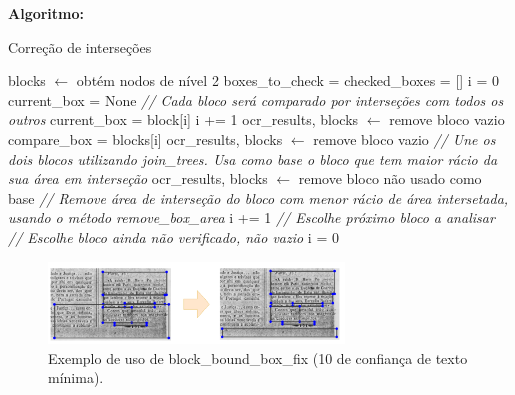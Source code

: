 \textbf{Algoritmo:}

\begin{breakablealgorithm}
	\caption{Correção de interseções}
	\begin{algorithmic}[1]

		\State blocks $\leftarrow$ obtém nodos de nível 2
		\State boxes\_to\_check = {}
		\State checked\_boxes = []
		\State i = 0
		\State current\_box = None
		\State \textit{// Cada bloco será comparado por interseções com todos os outros}
					\State current\_box = block[i]
					\State i += 1
				\Else
					\State ocr\_results, blocks $\leftarrow$ remove bloco vazio
				\EndIf
			\EndIf
				\State compare\_box = blocks[i]
					\State ocr\_results, blocks $\leftarrow$ remove bloco vazio
						\State \textit{// Une os dois blocos utilizando join\_trees. Usa como base o bloco que tem maior rácio da sua área em interseção}
						\State ocr\_results, blocks $\leftarrow$ remove bloco não usado como base
					\EndIf
				\Else
					\State \textit{// Remove área de interseção do bloco com menor rácio de área intersetada, usando o método remove\_box\_area}
				\EndIf
			\EndIf
			\State i += 1
				\State \textit{// Escolhe próximo bloco a analisar}
				\State  \State \textit{// Escolhe bloco ainda não verificado, não vazio}
					\State i = 0
				\EndIf
			\EndIf
		\EndWhile
	\end{algorithmic}
\end{breakablealgorithm}


\begin{figure}[H]
	\centering
	\includegraphics[width=0.7\textwidth]{images/ilustracoes/fix_bound_box_blocks.png}
	\caption{Exemplo de uso de block\_bound\_box\_fix (10 de confiança de texto mínima).}
	\label{fig:fix_bound_box_blocks}
\end{figure}



